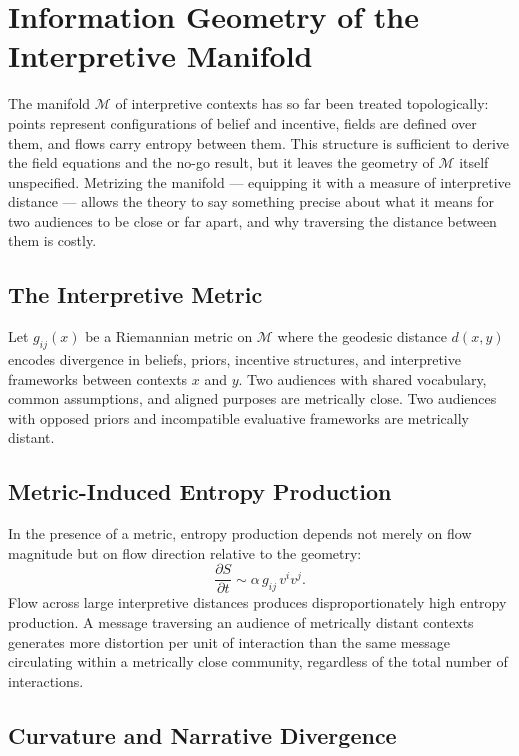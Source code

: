 \documentclass[12pt,a4paper]{article}
\begin{document}
\section{Information Geometry of the Interpretive Manifold}

The manifold $\mathcal{M}$ of interpretive contexts has so far been treated topologically: points represent configurations of belief and incentive, fields are defined over them, and flows carry entropy between them. This structure is sufficient to derive the field equations and the no-go result, but it leaves the geometry of $\mathcal{M}$ itself unspecified. Metrizing the manifold — equipping it with a measure of interpretive distance — allows the theory to say something precise about what it means for two audiences to be close or far apart, and why traversing the distance between them is costly.

\subsection{The Interpretive Metric}

Let $g_{ij}(x)$ be a Riemannian metric on $\mathcal{M}$ where the geodesic distance $d(x,y)$ encodes divergence in beliefs, priors, incentive structures, and interpretive frameworks between contexts $x$ and $y$. Two audiences with shared vocabulary, common assumptions, and aligned purposes are metrically close. Two audiences with opposed priors and incompatible evaluative frameworks are metrically distant.

\subsection{Metric-Induced Entropy Production}

In the presence of a metric, entropy production depends not merely on flow magnitude but on flow direction relative to the geometry:
\[
\frac{\partial S}{\partial t} \sim \alpha\, g_{ij}\, v^i v^j.
\]
Flow across large interpretive distances produces disproportionately high entropy production. A message traversing an audience of metrically distant contexts generates more distortion per unit of interaction than the same message circulating within a metrically close community, regardless of the total number of interactions.

\subsection{Curvature and Narrative Divergence}
\end{document}
